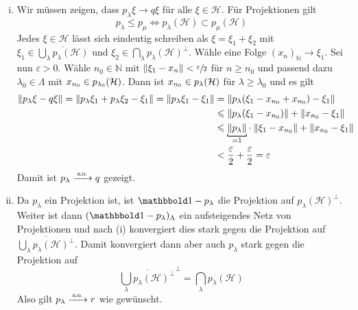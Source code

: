 \begin{beweis}
	\leavevmode
	\begin{enumerate}[(i)]
		\item Wir müssen zeigen, dass $p_\lambda \xi\to q \xi$ für alle $\xi \in \mathcal{H}$.
		Für Projektionen gilt
		\[
			p_\lambda \le p_\mu \iff p_\lambda(\mathcal{H}) \subset p_\mu(\mathcal{H})
		\]
		Jedes $\xi \in \mathcal{H}$ lässt sich eindeutig schreiben als $\xi=\xi_1 + \xi_2$ mit $\xi_1 \in \overline{\bigcup_\lambda p_\lambda(\mathcal{H})}$ und $\xi_2 \in \bigcap_\lambda p_\lambda(\mathcal{H})^\bot$.
		Wähle eine Folge $(x_n)_\mathbb{N} \to \xi_1$.
		Sei nun $\varepsilon>0$. Wähle $n_0 \in \mathbb{N}$ mit $\norm*{\xi_1-x_n}< \sfrac{\varepsilon}{2}$ für $n\ge n_0$ und passend dazu $\lambda_0 \in \Lambda$ mit $x_{n_0} \in p_{\lambda_0}\enbrace{\mathcal{H}}$.
		Dann ist $x_{n_0} \in p_\lambda \enbrace*{\mathcal{H}}$ für $\lambda\ge \lambda_0$ und es gilt
		\begin{align}
			\norm*{p_\lambda \xi -q \xi} = \norm*{p_\lambda \xi_1 + p_\lambda \xi_2 - \xi_1} = \norm*{p_\lambda \xi_1 - \xi_1} &= \norm*{p_\lambda \enbrace*{\xi_1 - x_{n_0} + x_{n_0}} - \xi_1} \\
			&\le \norm*{p_\lambda \enbrace*{\xi_1 - x_{n_0}}} + \norm*{x_{n_0} - \xi_1} \\
			&\le \Underbracket{\norm*{p_\lambda}}{=1} \cdot \norm*{\xi_1 - x_{n_0}} + \norm*{x_{n_0} - \xi_1} \\
			&< \frac{\varepsilon}{2} + \frac{\varepsilon}{2} = \varepsilon
		\end{align}
		Damit ist $p_\lambda \grenzw{\so} q$ gezeigt.
		\item Da $p_\lambda$ ein Projektion ist, ist $\ind - p_\lambda$ die Projektion auf $p_\lambda(\mathcal{H})^\bot$.
		Weiter ist dann $(\ind - p_\lambda)_\Lambda$ ein aufsteigendes Netz von Projektionen und nach (i) konvergiert dies stark gegen die Projektion auf $\overline{\bigcup_\lambda p_\lambda(\mathcal{H})^\bot}$.
		Damit konvergiert dann aber auch $p_\lambda$ stark gegen die Projektion auf
		\[
			\overline{\bigcup_\lambda p_\lambda(\mathcal{H})^\bot}^\bot = \bigcap_\lambda p_\lambda(\mathcal{H})
		\]
		Also gilt $p_\lambda \grenzw{\so} r$ wie gewünscht.\qedhere
	\end{enumerate}
\end{beweis}

